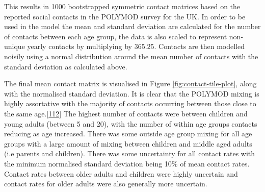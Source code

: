 \documentclass[11pt,twoside]{bristolthesis}
\begin{document}
  This results in 1000 bootstrapped symmetric contact matrices based on the reported social contacts in the POLYMOD survey for the UK. In order to be used in the model the mean and standard deviation are calculated for the number of contacts between each age group, the data is also scaled to represent non-unique yearly contacts by multiplying by \(365.25\). Contacts are then modelled noisily using a normal distribution around the mean number of contacts with the standard deviation as calculated above.
  
  The final mean contact matrix is visualised in Figure \ref{fig:contact-tile-plot}, along with the normalised standard deviation. It is clear that the POLYMOD mixing is highly assortative with the majority of contacts occurring between those close to the same age.{[}\protect\hyperlink{ref-Mossong2008}{112}{]} The highest number of contacts were between children and young adults (between 5 and 20), with the number of within age groups contacts reducing as age increased. There was some outside age group mixing for all age groups with a large amount of mixing between children and middle aged adults (i.e parents and children). There was some uncertainty for all contact rates with the minimum normalised standard deviation being 10\% of mean contact rates. Contact rates between older adults and children were highly uncertain and contact rates for older adults were also generally more uncertain.
\end{document}
